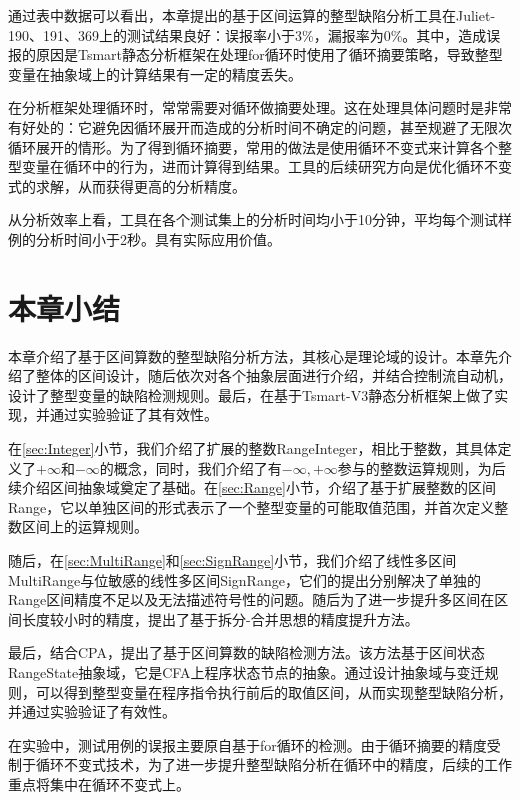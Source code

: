 通过表中数据可以看出，本章提出的基于区间运算的整型缺陷分析工具在Juliet-190、191、369上的测试结果良好：误报率小于3\%，漏报率为0\%。其中，造成误报的原因是Tsmart静态分析框架在处理for循环时使用了循环摘要策略，导致整型变量在抽象域上的计算结果有一定的精度丢失。

在分析框架处理循环时，常常需要对循环做摘要处理。这在处理具体问题时是非常有好处的：它避免因循环展开而造成的分析时间不确定的问题，甚至规避了无限次循环展开的情形。为了得到循环摘要，常用的做法是使用循环不变式来计算各个整型变量在循环中的行为，进而计算得到结果。工具的后续研究方向是优化循环不变式的求解，从而获得更高的分析精度。

从分析效率上看，工具在各个测试集上的分析时间均小于10分钟，平均每个测试样例的分析时间小于2秒。具有实际应用价值。

\section{本章小结}

本章介绍了基于区间算数的整型缺陷分析方法，其核心是理论域的设计。本章先介绍了整体的区间设计，随后依次对各个抽象层面进行介绍，并结合控制流自动机，设计了整型变量的缺陷检测规则。最后，在基于Tsmart-V3静态分析框架上做了实现，并通过实验验证了其有效性。

在\ref{sec:Integer}小节，我们介绍了扩展的整数RangeInteger，相比于整数，其具体定义了$ +\infty $和$ -\infty $的概念，同时，我们介绍了有$ -\infty, +\infty $参与的整数运算规则，为后续介绍区间抽象域奠定了基础。在\ref{sec:Range}小节，介绍了基于扩展整数的区间Range，它以单独区间的形式表示了一个整型变量的可能取值范围，并首次定义整数区间上的运算规则。

随后，在\ref{sec:MultiRange}和\ref{sec:SignRange}小节，我们介绍了线性多区间MultiRange与位敏感的线性多区间SignRange，它们的提出分别解决了单独的Range区间精度不足以及无法描述符号性的问题。随后为了进一步提升多区间在区间长度较小时的精度，提出了基于拆分-合并思想的精度提升方法。

最后，结合CPA，提出了基于区间算数的缺陷检测方法。该方法基于区间状态RangeState抽象域，它是CFA上程序状态节点的抽象。通过设计抽象域与变迁规则，可以得到整型变量在程序指令执行前后的取值区间，从而实现整型缺陷分析，并通过实验验证了有效性。

在实验中，测试用例的误报主要原自基于for循环的检测。由于循环摘要的精度受制于循环不变式技术，为了进一步提升整型缺陷分析在循环中的精度，后续的工作重点将集中在循环不变式上。



















































